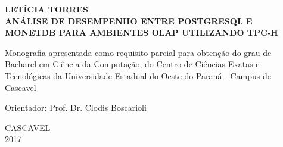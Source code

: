 

\fontsize{12}{12}
\begin{center}
\textbf{LETÍCIA TORRES}\\
\vspace{8cm}
\fontsize{14}{14}
\textbf{\MakeUppercase{Análise de Desempenho entre PostgreSQL e MonetDB para Ambientes OLAP Utilizando TPC-H}}\\
\vspace{2cm}
\end{center}
\fontsize{12}{12}

\begin{flushright}
\begin{minipage}[10cm] {8.5cm}
Monografia apresentada como requisito parcial para obtenção do grau de Bacharel em Ciência da Computação, do Centro de Ciências Exatas e Tecnológicas da Universidade Estadual do Oeste do Paraná - Campus de Cascavel

\vspace{1.5cm}
\noindent
Orientador: Prof. Dr. Clodis Boscarioli
\end{minipage}
\end{flushright}
\vspace{5cm}
\begin{center}
CASCAVEL\\
2017
\end{center}


